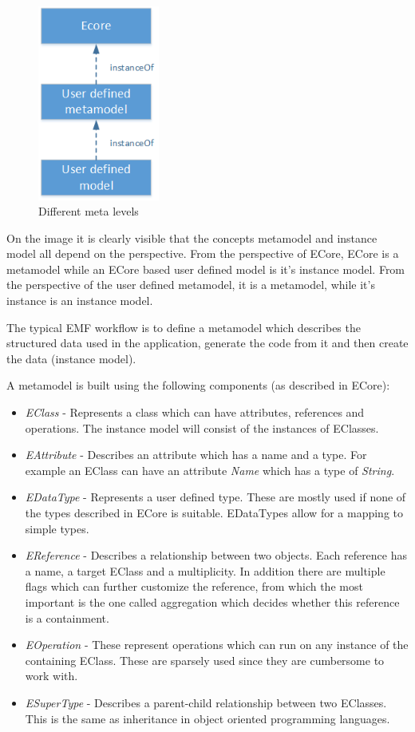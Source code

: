 \begin{figure}[!ht]
\centering
\includegraphics[width=40mm,keepaspectratio]{figures/ECore-Metamodel-Levels.png}
\caption{Different meta levels}
\label{fig:ECore-Metamodel-Rel}
\end{figure}

On the image it is clearly visible that the concepts metamodel and instance model
all depend on the perspective. From the perspective of ECore, ECore is a
metamodel while an ECore based user defined model is it's instance model. From
the perspective of the user defined metamodel, it is a metamodel, while it's
instance is an instance model.

The typical EMF workflow is to define a metamodel which describes the structured
data used in the application, generate the \Java{} code from it and then create
the data (instance model).

A metamodel is built using the following components (as described in ECore):

\begin{itemize}
  \item \emph{EClass} - Represents a class which can have attributes, references
  and operations. The instance model will consist of the instances of EClasses.
  \item \emph{EAttribute} - Describes an attribute which has a name and a type.
  For example an EClass can have an attribute \emph{Name} which has a type of
  \emph{String}.  
  \item \emph{EDataType} - Represents a user defined type. These are mostly used
  if none of the types described in ECore is suitable. EDataTypes allow for a
  mapping to simple \Java{} types.
  \item \emph{EReference} - Describes a relationship between two objects.
  Each reference has a name, a target EClass and a multiplicity. In addition
  there are multiple flags which can further customize the reference, from which
  the most important is the one called aggregation which decides whether this
  reference is a containment.
  \item \emph{EOperation} - These represent operations which can run on any
  instance of the containing EClass. These are sparsely used since they are
  cumbersome to work with.
  \item \emph{ESuperType} - Describes a parent-child relationship between two
  EClasses. This is the same as inheritance in object oriented programming
  languages.
\end{itemize}

